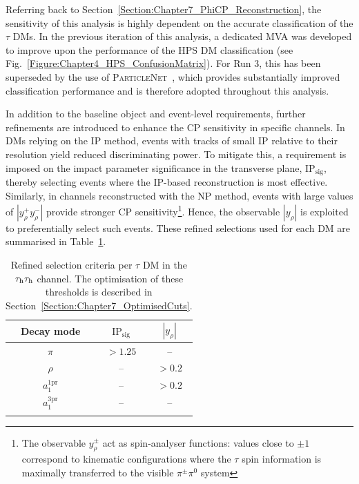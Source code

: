 Referring back to Section~\ref{Section:Chapter7_PhiCP_Reconstruction}, the sensitivity of this analysis is highly dependent on the accurate classification of the $\tau$ \acp{DM}. In the previous iteration of this analysis, a dedicated \ac{MVA} was developed to improve upon the performance of the \ac{HPS} \ac{DM} classification (see Fig.~\ref{Figure:Chapter4_HPS_ConfusionMatrix}). For Run 3, this has been superseded by the use of \textsc{ParticleNet}~\cite{Qu:2019gqs}, which provides substantially improved classification performance and is therefore adopted throughout this analysis.  

In addition to the baseline object and event-level requirements, further refinements are introduced to enhance the CP sensitivity in specific channels. In \acp{DM} relying on the \ac{IP} method, events with tracks of small \ac{IP} relative to their resolution yield reduced discriminating power. To mitigate this, a requirement is imposed on the impact parameter significance in the transverse plane, IP$_\text{sig}$, thereby selecting events where the \ac{IP}-based reconstruction is most effective. Similarly, in channels reconstructed with the \ac{NP} method, events with large values of 
$|y_\rho^+ y_\rho^-|$ provide stronger CP sensitivity\footnote{The observable $y_\rho^\pm$ act as spin-analyser functions: values close to $\pm 1$ correspond to kinematic configurations where the $\tau$ spin information is maximally transferred to the visible $\pi^\pm\pi^0$ system}. Hence, the observable $|y_\rho|$ is exploited to preferentially select such events. These refined selections used for each \ac{DM} are summarised in Table~\ref{Table:Chapter7_RefinedSelections_perDM}.  

\begin{table}[!htbp]
\centering
\renewcommand{\arraystretch}{1.5}
\setlength{\tabcolsep}{12pt}

\begin{tabular}{ccc}
\hline
Decay mode & $\text{IP}_\text{sig}$ & $|y_\rho|$ \\
\hline
$\pi$ &  $> 1.25$ & -- \\
\arrayrulecolor{lightgray} \hline
$\rho$ &  -- & $> 0.2$ \\
\arrayrulecolor{lightgray} \hline
$a_1^\text{1pr}$ &  -- & $> 0.2$ \\
\arrayrulecolor{lightgray} \hline
$a_1^\text{3pr}$ &  -- & -- \\
\arrayrulecolor{black} \hline
\end{tabular}
\caption[Refined selection criteria per $\tau$ decay mode in the $\tauh\tauh$ channel.]{
Refined selection criteria per $\tau$ \ac{DM} in the $\tauh\tauh$ channel. The optimisation of these thresholds is described in Section~\ref{Section:Chapter7_OptimisedCuts}.}
\label{Table:Chapter7_RefinedSelections_perDM}
\end{table}

